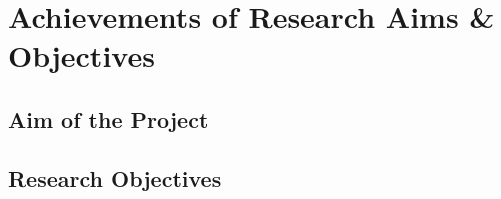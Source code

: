 \section{Achievements of Research Aims \& Objectives}

\subsection{Aim of the Project}

\subsection{Research Objectives}